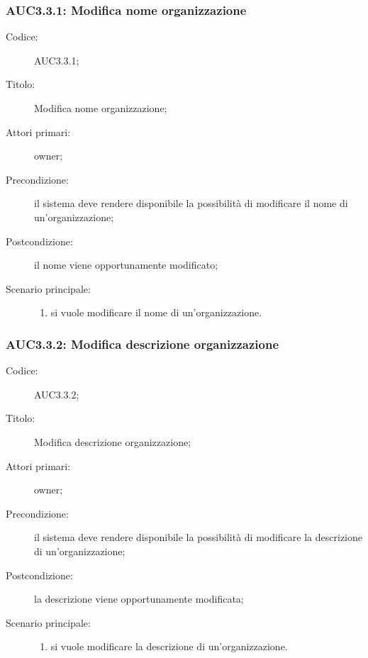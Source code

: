 \documentclass[../../../analisi-dei-requisiti.tex]{subfiles}
\begin{document}
\subsubsection{AUC3.3.1: Modifica nome organizzazione}%
\label{subs:AUC3.3.1}
\begin{description}
  \item[Codice:] AUC3.3.1;
  \item[Titolo:] Modifica nome organizzazione;
  \item[Attori primari:] owner;
  \item[Precondizione:] il sistema deve rendere disponibile la possibilità di modificare il nome di un'organizzazione;
  \item[Postcondizione:] il nome viene opportunamente modificato;
  \item[Scenario principale:]
        \begin{enumerate}
          \item si vuole modificare il nome di un'organizzazione.
        \end{enumerate}
\end{description}

\subsubsection{AUC3.3.2: Modifica descrizione organizzazione}%
\label{subs:AUC3.3.2}
\begin{description}
  \item[Codice:] AUC3.3.2;
  \item[Titolo:] Modifica descrizione organizzazione;
  \item[Attori primari:] owner;
  \item[Precondizione:] il sistema deve rendere disponibile la possibilità di modificare la descrizione di un'organizzazione;
  \item[Postcondizione:] la descrizione viene opportunamente modificata;
  \item[Scenario principale:]
        \begin{enumerate}
          \item si vuole modificare la descrizione di un'organizzazione.
        \end{enumerate}
\end{description}
\end{document}
